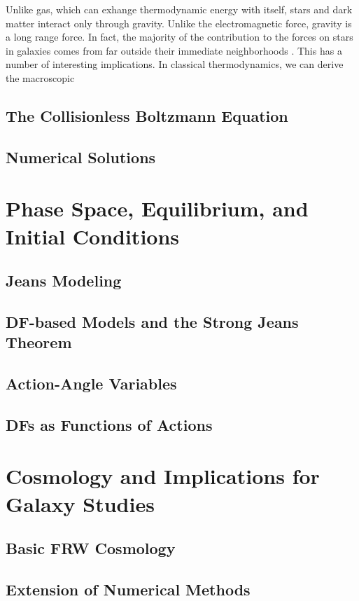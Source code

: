 Unlike gas, which can exhange thermodynamic energy with itself, stars and dark matter interact only through gravity. Unlike the electromagnetic force, gravity is a long range force. In fact, the majority of the contribution to the forces on stars in galaxies comes from far outside their immediate neighborhoods \citep{BT}. This has a number of interesting implications. In classical thermodynamics, we can derive the macroscopic 

\subsection{The Collisionless Boltzmann Equation}
\subsection{Numerical Solutions}

\section{Phase Space, Equilibrium, and Initial Conditions} \label{sec:galaxy_ics}
\subsection{Jeans Modeling}
\subsection{DF-based Models and the Strong Jeans Theorem}
\subsection{Action-Angle Variables}
\subsection{DFs as Functions of Actions}

\section{Cosmology and Implications for Galaxy Studies} \label{sec:cosmology}
\subsection{Basic FRW Cosmology}
\subsection{Extension of Numerical Methods}
